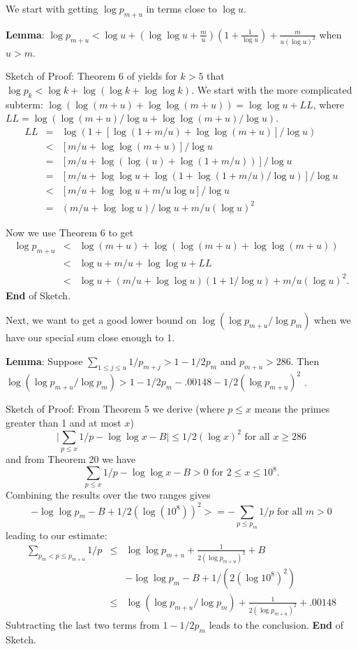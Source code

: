 \documentclass[12pt,leqno]{article}
\begin{document}
We start with getting $\log p_{m+u}$ in terms close to $\log u$. 

\textbf{Lemma}: $\log p_{m+u} \lt \log u  + 
(\log\log u + \frac{m}{u})(1 + \frac{1}{\log u}) + \frac{m}{u(\log u)^2}$ when
$u \gt m$.

Sketch of Proof:
Theorem 6 of \cite{RS} yields for $k \gt 5$ that 
$\log p_k  \lt \log k + \log(\log k + \log\log k)$.
We start with the more complicated subterm:
$\log(\log(m+u) + \log\log(m+u)) = \log\log u + LL$, where
$LL = \log(\log(m+u)/\log u + \log\log(m+u)/\log u)$. 
\begin{eqnarray*}  
  LL &  =  & \log(1 + [\log(1 + m/u) + \log\log(m+u)]/\log u) \\
    &  \lt &  [m/u + \log\log(m+u)]/\log u \\
    &  = & [m/u + \log(\log(u) + \log(1 + m/u))]/\log u \\
    &  = & [m/u + \log\log u + \log(1 + \log(1+ m/u)/\log u )]/\log u \\
    & \lt & [m/u + \log\log u + m/u\log u]/\log u \\
    & = & (m/u + \log\log u)/\log u  + m/u(\log u)^2
\end{eqnarray*}

Now we use Theorem 6 to get
\begin{eqnarray*}
\log p_{m+u} & \lt & \log(m+u) + \log(\log(m+u) + \log\log(m+u)) \\
  & \lt & \log u + m/u + \log\log u + LL \\
  & \lt & \log u + (m/u + \log\log u)(1 + 1/\log u) + m/u(\log u)^2.
\end{eqnarray*}
\textbf{End} of Sketch.

Next, we want to get a good lower bound on $\log(\log p_{m+u}/\log p_m)$ when we have
our special sum close enough to 1.

\textbf{Lemma}: Suppose $\sum_{1 \leq j \leq u} 1/p_{m+j} \gt 1 - 1/2p_m$ and 
$p_{m+u} \gt 286$.  
Then $\log(\log p_{m+u}/\log p_m) \gt 1 - 1/2p_m - .00148 - 1/2(\log p_{m+u})^2$ .

Sketch of Proof: From \cite{RS} Theorem 5 we derive (where
$p \leq x$ means the primes greater than 1 and at most $x$) 
$$\mid \sum_{p\leq x} 1/p - \log\log x -B \mid \leq 1/2(\log x)^2 \textrm{ for all } x \geq 286$$
and from \cite{RS} Theorem 20 we have    
$$ \sum_{p \leq x} 1/p - \log\log x -B \gt 0 \textrm{ for } 2 \leq x \leq 10^8.$$
Combining the results over the two ranges gives  
$$-\log\log p_m - B + 1/2(\log(10^8))^2 >= - \sum_{p \leq p_m} 1/p \textrm{ for all } m \gt 0$$
leading to our estimate:
\begin{eqnarray*}
\sum_{p_m \lt p \leq p_{m+u}} 1/p & \leq & \log\log p_{m+u} + \frac{1}{2(\log p_{m+u})^2} +B \\
                                  &      & -\log\log p_m -B +1/(2(\log 10^8)^2) \\
 & \leq & \log(\log p_{m+u}/\log p_m ) + \frac{1}{2(\log p_{m+u})^2} + .00148
\end{eqnarray*}
Subtracting the last two terms from $1 - 1/2p_m$ leads to the conclusion.
\textbf{End} of Sketch.
\end{document}
